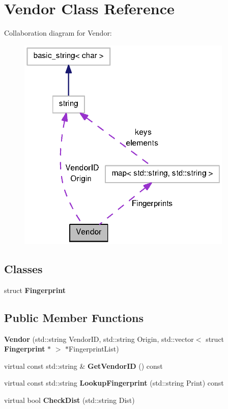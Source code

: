 \section{\-Vendor \-Class \-Reference}
\label{classVendor}


\-Collaboration diagram for \-Vendor\-:
\nopagebreak
\begin{figure}[H]
\begin{center}
\leavevmode
\includegraphics[width=291pt]{classVendor__coll__graph}
\end{center}
\end{figure}
\subsection*{\-Classes}
\begin{DoxyCompactItemize}
\item 
struct {\bf \-Fingerprint}
\end{DoxyCompactItemize}
\subsection*{\-Public \-Member \-Functions}
\begin{DoxyCompactItemize}
\item 
{\bfseries \-Vendor} (std\-::string \-Vendor\-I\-D, std\-::string \-Origin, std\-::vector$<$ struct {\bf \-Fingerprint} $\ast$ $>$ $\ast$\-Fingerprint\-List)\label{classVendor_a923911b0be2aa010185660c607ba4747}

\item 
virtual const std\-::string \& {\bfseries \-Get\-Vendor\-I\-D} () const \label{classVendor_a12f9183f3e403217d8285c1f8921d8df}

\item 
virtual const std\-::string {\bfseries \-Lookup\-Fingerprint} (std\-::string \-Print) const \label{classVendor_ac3b148e15ddcc8543008622fc78bd1c8}

\item 
virtual bool {\bfseries \-Check\-Dist} (std\-::string \-Dist)\label{classVendor_a51a1a731deb895b95556416e3dd2451c}

\end{DoxyCompactItemize}
